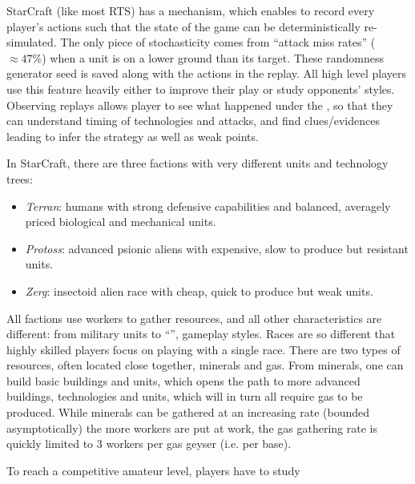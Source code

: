 StarCraft (like most RTS) has a \textit{} mechanism, which enables to record every player's actions such that the state of the game can be deterministically re-simulated. The only piece of stochasticity comes from ``attack miss rates'' ($\approx 47\%$) when a unit is on a lower ground than its target. These randomness generator seed is saved along with the actions in the replay. All high level players use this feature heavily either to improve their play or study opponents' styles. Observing replays allows player to see what happened under the , so that they can understand timing of technologies and attacks, and find clues/evidences leading to infer the strategy as well as weak points.


In StarCraft, there are three factions with very different units and technology trees:
\begin{itemize}
    \item \textit{Terran}: humans with strong defensive capabilities and balanced, averagely priced biological and mechanical units.
    \item \textit{Protoss}: advanced psionic aliens with expensive, slow to produce but resistant units.
    \item \textit{Zerg}: insectoid alien race with cheap, quick to produce but weak units.
\end{itemize}
All factions use workers to gather resources, and all other characteristics are different: from military units to ``'', gameplay styles. Races are so different that highly skilled players focus on playing with a single race. There are two types of resources, often located close together, minerals and gas. From minerals, one can build basic buildings and units, which opens the path to more advanced buildings, technologies and units, which will in turn all require gas to be produced. While minerals can be gathered at an increasing rate (bounded asymptotically) the more workers are put at work, the gas gathering rate is quickly limited to 3 workers per gas geyser (i.e. per base).


To reach a competitive amateur level, players have to study 


